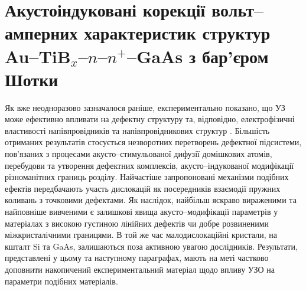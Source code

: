 \documentclass[a4paper,14pt,oneside,openany]{memoir}
\begin{document}
%




\section{Акустоіндуковані корекції вольт--амперних характеристик структур Au--TiB$_x$--$n$--$n^+$--GaAs з бар'єром Шотки\label{MSGA}}

Як вже неодноразово зазначалося раніше, експериментально показано, що УЗ може ефективно впливати на дефектну структуру та, відповідно, електрофізичні властивості напівпровідників та напівпровідникових структур \cite{Parchinskii2000r,Zaver,OlikhFTT,Parchinskii2003r,Ostrov2002FTPr,UST:SDErmol}.
Більшість отриманих результатів стосується незворотних перетворень  дефектної підсистеми, пов'язаних з процесами акусто--стимульованої дифузії домішкових атомів,  перебудови та утворення дефектних комплексів,  акусто--індукованої модифікації різноманітних границь розділу.
Найчастіше запропоновані механізми подібних ефектів передбачають участь дислокацій як посередників взаємодії пружних коливань з точковими дефектами.
Як наслідок, найбільш яскраво вираженими та найповніше вивченими є залишкові явища акусто--модифікації параметрів у матеріалах з високою густиною лінійних дефектів чи добре розвиненими міжкристалічними границями.
В той же час малодислокаційні кристали, на кшталт Si та GaAs, залишаються поза активною увагою дослідників.
Результати, представлені у цьому та наступному параграфах, мають на меті частково доповнити
накопичений експериментальний матеріал щодо впливу УЗО на параметри подібних матеріалів.
\end{document}
